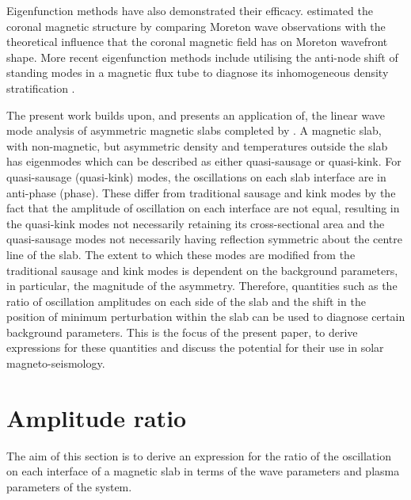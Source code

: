 \documentclass[namedreferences]{solarphysics}
\numberwithin{equation}{section}
\begin{document}
\begin{article}
Eigenfunction methods have also demonstrated their efficacy. \cite{uch70} estimated the coronal magnetic structure by comparing Moreton wave observations with the theoretical influence that the coronal magnetic field has on Moreton wavefront shape. More recent eigenfunction methods include utilising the anti-node shift of standing modes in a magnetic flux tube to diagnose its inhomogeneous density stratification \citep{ver_etal07,erd_etal14}.

The present work builds upon, and presents an application of, the linear wave mode analysis of asymmetric magnetic slabs completed by \cite{all_etal17}. A magnetic slab, with non-magnetic, but asymmetric density and temperatures outside the slab has eigenmodes which can be described as either quasi-sausage or quasi-kink. For quasi-sausage (quasi-kink) modes, the oscillations on each slab interface are in anti-phase (phase). These differ from traditional sausage and kink modes by the fact that the amplitude of oscillation on each interface are not equal, resulting in the quasi-kink modes not necessarily retaining its cross-sectional area and the quasi-sausage modes not necessarily having reflection symmetric about the centre line of the slab. The extent to which these modes are modified from the traditional sausage and kink modes is dependent on the background parameters, in particular, the magnitude of the asymmetry. Therefore, quantities such as the ratio of oscillation amplitudes on each side of the slab and the shift in the position of minimum perturbation within the slab can be used to diagnose certain background parameters. This is the focus of the present paper, to derive expressions for these quantities and discuss the potential for their use in solar magneto-seismology.


\section{Amplitude ratio} \label{sec: AR}
The aim of this section is to derive an expression for the ratio of the oscillation on each interface of a magnetic slab in terms of the wave parameters and plasma parameters of the system.


\end{article}
\end{document}
